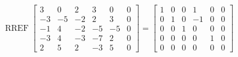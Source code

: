 \begin{exerciseAnswer} 


\[\operatorname{RREF} \left[\begin{array}{ccccc|c}
3 & 0 & 2 & 3 & 0 & 0 \\
-3 & -5 & -2 & 2 & 3 & 0 \\
-1 & 4 & -2 & -5 & -5 & 0 \\
-3 & 4 & -3 & -7 & 2 & 0 \\
2 & 5 & 2 & -3 & 5 & 0
\end{array}\right] = \left[\begin{array}{ccccc|c}
1 & 0 & 0 & 1 & 0 & 0 \\
0 & 1 & 0 & -1 & 0 & 0 \\
0 & 0 & 1 & 0 & 0 & 0 \\
0 & 0 & 0 & 0 & 1 & 0 \\
0 & 0 & 0 & 0 & 0 & 0
\end{array}\right] \]



\end{exerciseAnswer}
